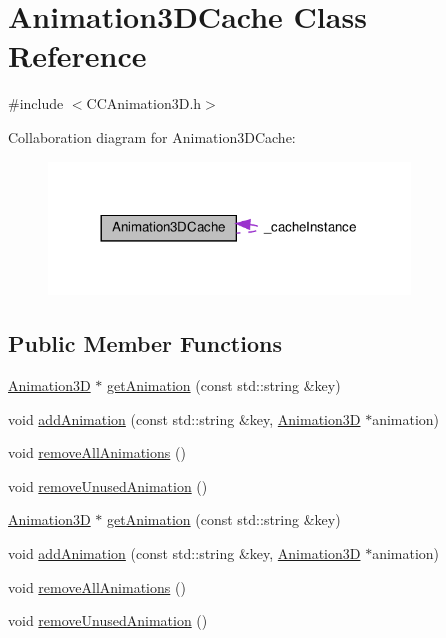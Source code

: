 \hypertarget{classAnimation3DCache}{}\section{Animation3\+D\+Cache Class Reference}
\label{classAnimation3DCache}


{\ttfamily \#include $<$C\+C\+Animation3\+D.\+h$>$}



Collaboration diagram for Animation3\+D\+Cache\+:
\nopagebreak
\begin{figure}[H]
\begin{center}
\leavevmode
\includegraphics[width=272pt]{classAnimation3DCache__coll__graph}
\end{center}
\end{figure}
\subsection*{Public Member Functions}
\begin{DoxyCompactItemize}
\item 
\hyperlink{classAnimation3D}{Animation3D} $\ast$ \hyperlink{classAnimation3DCache_a67135314f2d71c475661f5298ca0fcd7}{get\+Animation} (const std\+::string \&key)
\item 
void \hyperlink{classAnimation3DCache_a16030c9889f28bcb8b04dcb380e74243}{add\+Animation} (const std\+::string \&key, \hyperlink{classAnimation3D}{Animation3D} $\ast$animation)
\item 
void \hyperlink{classAnimation3DCache_ab67a540ab29fa1376bf34802c52fe3f1}{remove\+All\+Animations} ()
\item 
void \hyperlink{classAnimation3DCache_a1e0a94f429abffe1a904a77df8336532}{remove\+Unused\+Animation} ()
\item 
\hyperlink{classAnimation3D}{Animation3D} $\ast$ \hyperlink{classAnimation3DCache_ab5cc758098c8b406fd9564aac0ac4753}{get\+Animation} (const std\+::string \&key)
\item 
void \hyperlink{classAnimation3DCache_a16030c9889f28bcb8b04dcb380e74243}{add\+Animation} (const std\+::string \&key, \hyperlink{classAnimation3D}{Animation3D} $\ast$animation)
\item 
void \hyperlink{classAnimation3DCache_ab67a540ab29fa1376bf34802c52fe3f1}{remove\+All\+Animations} ()
\item 
void \hyperlink{classAnimation3DCache_a1e0a94f429abffe1a904a77df8336532}{remove\+Unused\+Animation} ()
\end{DoxyCompactItemize}
